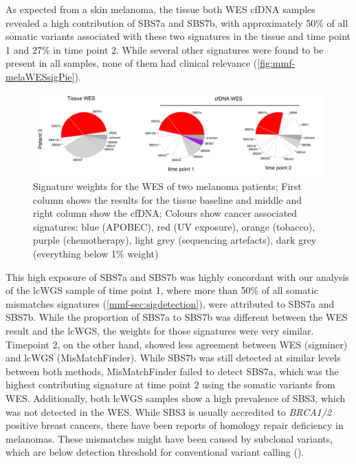As expected from a skin melanoma, the tissue  both WES cfDNA samples revealed a high contribution of SBS7a and SBS7b, with approximately 50\%  of all somatic variants associated with these two signatures in the tissue and time point 1 and 27\% in time point 2. While several other signatures were found to be present in all samples, none of them had clinical relevance (\autoref{fig:mmf-melaWESsigPie}).

\begin{figure}[ht]
\centering
\includegraphics[width=.99\linewidth]{Figures/MisMatchFinder/melanomaWESsignatures.pdf}
\caption[Signature weights for the WES of two melanoma patients]{Signature weights for the WES of two melanoma patients; First column shows the results for the tissue baseline and middle and right column show the cfDNA; Colours show cancer associated signatures: blue (APOBEC), red (UV exposure), orange (tobacco), purple (chemotherapy), light grey (sequencing artefacts), dark grey (everything below 1\% weight)}\label{fig:mmf-melaWESsigPie}
\end{figure}
 
This high exposure of SBS7a and SBS7b was highly concordant with our analysis of the lcWGS sample of time point 1, where more than 50\% of all  somatic mismatches signatures (\autoref{mmf-sec:sigdetection}), were attributed to SBS7a and SBS7b. While the proportion of SBS7a to SBS7b was different between the WES result and the lcWGS, the weights for those signatures were very similar. Timepoint 2, on the other hand, showed less agreement between WES (sigminer) and lcWGS (MisMatchFinder). While SBS7b was still detected at similar levels between both methods, MisMatchFinder failed to detect SBS7a, which was the highest contributing signature at time point 2 using the somatic variants from WES. Additionally, both lcWGS samples show a high prevalence of SBS3, which was not detected in the WES. While SBS3 is usually accredited to \textit{BRCA1/2} positive breast cancers, there have been reports of homology repair deficiency in melanomas. These mismatches might have been caused by subclonal variants, which are below  detection threshold for conventional variant calling ().

